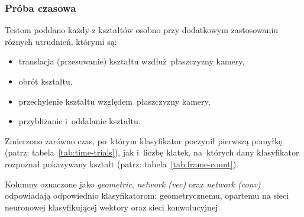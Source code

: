 \documentclass[11pt,a4paper]{article}
\begin{document}
\subsubsection{Próba czasowa}

Testom poddano każdy z kształtów osobno przy dodatkowym zastosowaniu różnych utrudnień, którymi są:
\begin{itemize}
    \item translacja (przesuwanie) kształtu wzdłuż~płaszczyzny kamery,
    \item obrót kształtu,
    \item przechylenie kształtu względem~płaszczyzny kamery,
    \item przybliżanie i~oddalanie kształtu.
\end{itemize}

Zmierzono zarówno czas, po~którym klasyfikator poczynił pierwszą pomyłkę (patrz: tabela~\ref{tab:time-trials}), jak i~liczbę klatek, na~których dany klasyfikator rozpoznał pokazywany kształt (patrz: tabela~\ref{tab:frame-count}).

Kolumny oznaczone jako \emph{geometric}, \emph{network (vec)} oraz \emph{network (conv)} odpowiadają odpowiednio klasyfikatorom: geometrycznemu, opartemu na sieci neuronowej klasyfikującej wektory oraz sieci konwolucyjnej.
\end{document}
